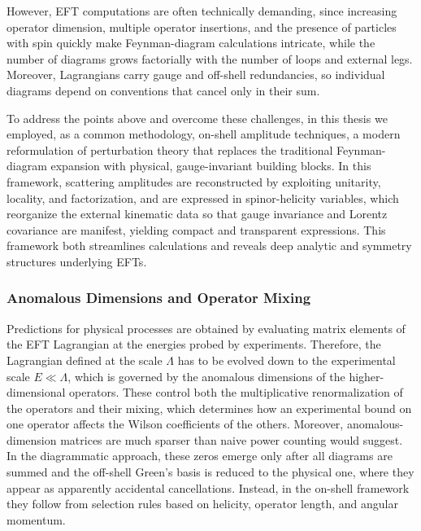 However, EFT computations are often technically demanding, since increasing operator dimension,
multiple operator insertions, and the presence of particles with spin quickly make Feynman-diagram
calculations intricate, while the number of diagrams grows factorially with the number of loops and
external legs. Moreover, Lagrangians carry gauge and off-shell redundancies, so individual diagrams
depend on conventions that cancel only in their sum.

To address the points above and overcome these challenges, in this thesis we employed, as a common methodology, on-shell
amplitude techniques, a modern reformulation of perturbation theory that replaces the traditional
Feynman-diagram expansion with physical, gauge-invariant building blocks. In this framework,
scattering amplitudes are reconstructed by exploiting unitarity, locality, and factorization, and
are expressed in spinor-helicity variables, which reorganize the external kinematic data so that
gauge invariance and Lorentz covariance are manifest, yielding compact and transparent expressions.
This framework both streamlines calculations and reveals deep analytic and symmetry structures
underlying EFTs.

\subsubsection*{Anomalous Dimensions and Operator Mixing}

Predictions for physical processes are obtained by evaluating matrix elements of the EFT Lagrangian
at the energies probed by experiments. Therefore, the Lagrangian defined at the scale $\Lambda$ has
to be evolved down to the experimental scale $E \ll \Lambda$, which is governed by the anomalous
dimensions of the higher-dimensional operators. These control both the multiplicative
renormalization of the operators and their mixing, which determines how an experimental bound on one
operator affects the Wilson coefficients of the others. Moreover, anomalous-dimension matrices are
much sparser than naive power counting would suggest. In the diagrammatic approach, these zeros
emerge only after all diagrams are summed and the off-shell Green's basis is reduced to the physical
one, where they appear as apparently accidental cancellations. Instead, in the on-shell framework they follow
from selection rules based on helicity, operator length, and angular momentum. 

